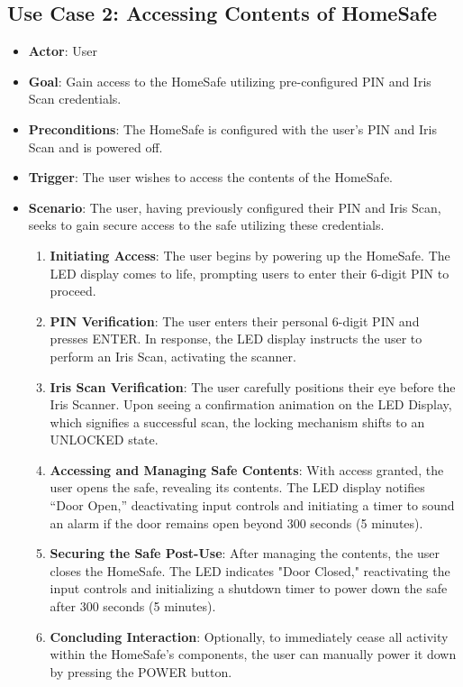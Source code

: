 \documentclass{article}
\begin{document}
\subsection{Use Case 2: Accessing Contents of HomeSafe}
\begin{itemize}
    \item \textbf{Actor}: User
    \item \textbf{Goal}: Gain access to the HomeSafe utilizing pre-configured PIN and Iris Scan credentials.
    \item \textbf{Preconditions}:  The HomeSafe is configured with the user’s PIN and Iris Scan and is powered off.
    \item \textbf{Trigger}: The user wishes to access the contents of the HomeSafe.
    \item \textbf{Scenario}: The user, having previously configured their PIN and Iris Scan, seeks to gain secure access to the safe utilizing these credentials.
    \begin{enumerate}
    \item \textbf{Initiating Access}: The user begins by powering up the HomeSafe. The LED display comes to life, prompting users to enter their 6-digit PIN to proceed.
    \item \textbf{PIN Verification}: The user enters their personal 6-digit PIN and presses ENTER. In response, the LED display instructs the user to perform an Iris Scan, activating the scanner.
    \item \textbf{Iris Scan Verification}: The user carefully positions their eye before the Iris Scanner. Upon seeing a confirmation animation on the LED Display, which signifies a successful scan, the locking mechanism shifts to an UNLOCKED state.
    \item \textbf{Accessing and Managing Safe Contents}: With access granted, the user opens the safe, revealing its contents. The LED display notifies “Door Open,” deactivating input controls and initiating a timer to sound an alarm if the door remains open beyond 300 seconds (5 minutes).
    \item \textbf{Securing the Safe Post-Use}: After managing the contents, the user closes the HomeSafe. The LED indicates "Door Closed," reactivating the input controls and initializing a shutdown timer to power down the safe after 300 seconds (5 minutes).
    \item \textbf{Concluding Interaction}: Optionally, to immediately cease all activity within the HomeSafe’s components, the user can manually power it down by pressing the POWER button.
    \end{enumerate}
\end{itemize}
\end{document}
